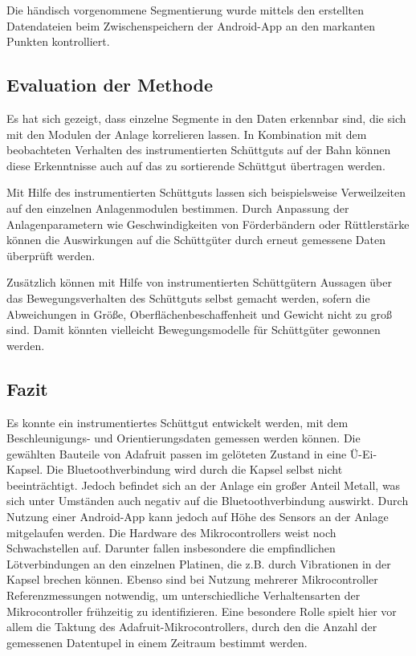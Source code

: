Die händisch vorgenommene Segmentierung wurde mittels den erstellten Datendateien beim Zwischenspeichern der Android-App an den markanten Punkten kontrolliert.

\newpage
\subsection{Evaluation der Methode}
Es hat sich gezeigt, dass einzelne Segmente in den Daten erkennbar sind, die sich mit den Modulen der Anlage korrelieren lassen. In Kombination mit dem beobachteten Verhalten des instrumentierten Schüttguts auf der Bahn können diese Erkenntnisse auch auf das zu sortierende Schüttgut übertragen werden. 

Mit Hilfe des instrumentierten Schüttguts lassen sich beispielsweise Verweilzeiten auf den einzelnen Anlagenmodulen bestimmen. Durch Anpassung der Anlagenparametern wie Geschwindigkeiten von Förderbändern oder Rüttlerstärke können die Auswirkungen auf die Schüttgüter durch erneut gemessene Daten überprüft werden.

Zusätzlich können mit Hilfe von instrumentierten Schüttgütern Aussagen über das Bewegungsverhalten des Schüttguts selbst gemacht werden, sofern die Abweichungen in Größe, Oberflächenbeschaffenheit und Gewicht nicht zu groß sind. Damit könnten vielleicht Bewegungsmodelle für Schüttgüter gewonnen werden.

\subsection{Fazit}

Es konnte ein instrumentiertes Schüttgut entwickelt werden, mit dem Beschleunigungs- und Orientierungsdaten gemessen werden können. Die gewählten Bauteile von Adafruit passen im gelöteten Zustand in eine Ü-Ei-Kapsel. Die Bluetoothverbindung wird durch die Kapsel selbst nicht beeinträchtigt. Jedoch befindet sich an der Anlage ein großer Anteil Metall, was sich unter Umständen auch negativ auf die Bluetoothverbindung auswirkt. Durch Nutzung einer Android-App kann jedoch auf Höhe des Sensors an der Anlage mitgelaufen werden. Die Hardware des Mikrocontrollers weist noch Schwachstellen auf. Darunter fallen insbesondere die empfindlichen Lötverbindungen an den einzelnen Platinen, die z.B. durch Vibrationen in der Kapsel brechen können. Ebenso sind bei Nutzung mehrerer Mikrocontroller Referenzmessungen notwendig, um unterschiedliche Verhaltensarten der Mikrocontroller frühzeitig zu identifizieren. Eine besondere Rolle spielt hier vor allem die Taktung des Adafruit-Mikrocontrollers, durch den die Anzahl der gemessenen Datentupel in einem Zeitraum bestimmt werden.

